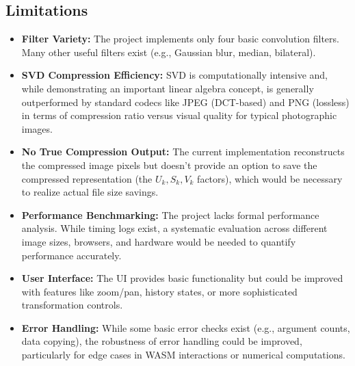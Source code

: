\documentclass{article}
\begin{document}
\subsection{Limitations}
\begin{itemize}
    \item \textbf{Filter Variety:} The project implements only four basic convolution filters. Many other useful filters exist (e.g., Gaussian blur, median, bilateral).
    \item \textbf{SVD Compression Efficiency:} SVD is computationally intensive and, while demonstrating an important linear algebra concept, is generally outperformed by standard codecs like JPEG (DCT-based) and PNG (lossless) in terms of compression ratio versus visual quality for typical photographic images.
    \item \textbf{No True Compression Output:} The current implementation reconstructs the compressed image pixels but doesn't provide an option to save the compressed representation (the $U_k, S_k, V_k$ factors), which would be necessary to realize actual file size savings.
    \item \textbf{Performance Benchmarking:} The project lacks formal performance analysis. While timing logs exist, a systematic evaluation across different image sizes, browsers, and hardware would be needed to quantify performance accurately.
    \item \textbf{User Interface:} The UI provides basic functionality but could be improved with features like zoom/pan, history states, or more sophisticated transformation controls.
    \item \textbf{Error Handling:} While some basic error checks exist (e.g., argument counts, data copying), the robustness of error handling could be improved, particularly for edge cases in WASM interactions or numerical computations.
\end{itemize}

\end{document}
